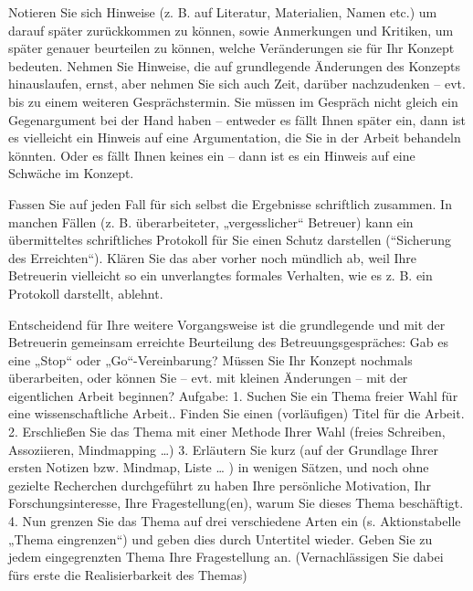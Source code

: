 \documentclass[]{article}
\begin{document}
Notieren Sie sich Hinweise (z. B. auf Literatur, Materialien, Namen
etc.) um darauf später zurückkommen zu können, sowie Anmerkungen und
Kritiken, um später genauer beurteilen zu können, welche Veränderungen
sie für Ihr Konzept bedeuten. Nehmen Sie Hinweise, die auf grundlegende
Änderungen des Konzepts hinauslaufen, ernst, aber nehmen Sie sich auch
Zeit, darüber nachzudenken -- evt. bis zu einem weiteren
Gesprächstermin. Sie müssen im Gespräch nicht gleich ein Gegenargument
bei der Hand haben -- entweder es fällt Ihnen später ein, dann ist es
vielleicht ein Hinweis auf eine Argumentation, die Sie in der Arbeit
behandeln könnten. Oder es fällt Ihnen keines ein -- dann ist es ein
Hinweis auf eine Schwäche im Konzept.

Fassen Sie auf jeden Fall für sich selbst die Ergebnisse schriftlich
zusammen. In manchen Fällen (z. B. überarbeiteter, „vergesslicher``
Betreuer) kann ein übermitteltes schriftliches Protokoll für Sie einen
Schutz darstellen (``Sicherung des Erreichten``). Klären Sie das aber
vorher noch mündlich ab, weil Ihre Betreuerin vielleicht so ein
unverlangtes formales Verhalten, wie es z. B. ein Protokoll darstellt,
ablehnt.

Entscheidend für Ihre weitere Vorgangsweise ist die grundlegende und mit
der Betreuerin gemeinsam erreichte Beurteilung des Betreuungsgespräches:
Gab es eine „Stop`` oder „Go``-Vereinbarung? Müssen Sie Ihr Konzept
nochmals überarbeiten, oder können Sie -- evt. mit kleinen Änderungen --
mit der eigentlichen Arbeit beginnen? Aufgabe: 1. Suchen Sie ein Thema
freier Wahl für eine wissenschaftliche Arbeit.. Finden Sie einen
(vorläufigen) Titel für die Arbeit. 2. Erschließen Sie das Thema mit
einer Methode Ihrer Wahl (freies Schreiben, Assoziieren, Mindmapping
\ldots{}) 3. Erläutern Sie kurz (auf der Grundlage Ihrer ersten Notizen
bzw. Mindmap, Liste \ldots{} ) in wenigen Sätzen, und noch ohne gezielte
Recherchen durchgeführt zu haben Ihre persönliche Motivation, Ihr
Forschungsinteresse, Ihre Fragestellung(en), warum Sie dieses Thema
beschäftigt. 4. Nun grenzen Sie das Thema auf drei verschiedene Arten
ein (s. Aktionstabelle „Thema eingrenzen``) und geben dies durch
Untertitel wieder. Geben Sie zu jedem eingegrenzten Thema Ihre
Fragestellung an. (Vernachlässigen Sie dabei fürs erste die
Realisierbarkeit des Themas)
\end{document}
